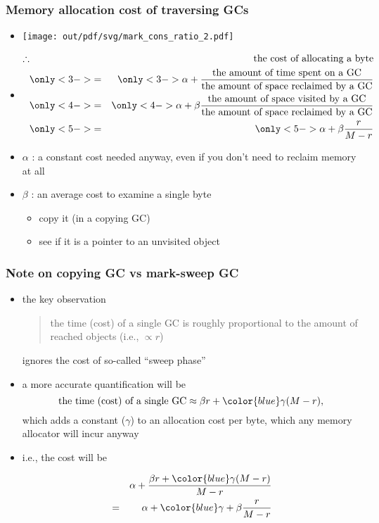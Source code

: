 \documentclass[11pt,dvipdfmx]{beamer}
\newcommand{\ao}[1]{{\color{blue}#1}}
\begin{document}
\begin{frame}
  \frametitle{Memory allocation cost of traversing GCs}
  \begin{itemize}
  \item<1-> []
\begin{center}
\texttt{[image: out/pdf/svg/mark\_cons\_ratio\_2.pdf]}
\end{center}
\item<2-> []
  \begin{eqnarray*}
    \therefore
    & & \mbox{the cost of allocating a byte} \\
    & \only<3->{=} & \only<3->{\alpha + \frac{\mbox{the amount of time spent on a GC}}
                     {\mbox{the amount of space reclaimed by a GC}}} \\
    & \only<4->{=} & \only<4->{\alpha + \beta \frac{\mbox{the amount of space visited by a GC}}
                           {\mbox{the amount of space reclaimed by a GC}}} \\
    & \only<5->{=} & \only<5->{\alpha + \beta \frac{r}{M - r}}
  \end{eqnarray*}

  \item<3-> $\alpha$ : a constant cost needed anyway, even if you don't need to reclaim memory at all
  \item<5-> $\beta$ : an average cost to examine a single byte
    \begin{itemize}
    \item copy it (in a copying GC)
    \item see if it is a pointer to an unvisited object
    \end{itemize}
\end{itemize}
\end{frame}
\fi


\begin{frame}
  \frametitle{Note on copying GC vs mark-sweep GC}
  \begin{itemize}
  \item the key observation
    \begin{quote}
      \ao{the time (cost) of a single GC is roughly proportional to the amount of reached objects (i.e., $\propto r$)}
    \end{quote}
    ignores the cost of so-called ``sweep phase''

  \item a more accurate quantification will be
    \[ \mbox{the time (cost) of a single GC}
      \approx \beta r + \ao{\gamma (M - r)}, \]
    which adds a constant ($\gamma$) to an allocation cost
    per byte, which any memory allocator will incur anyway

  \item i.e., the cost will be 

  \begin{eqnarray*}
    &   & \alpha + \frac{\beta r + \ao{\gamma (M - r)}}{M-r} \\
    & = & \alpha + \ao{\gamma} + \beta \frac{r}{M-r} \\
  \end{eqnarray*}
  
  \end{itemize}
\end{frame}
\end{document}
